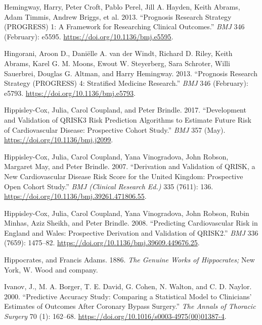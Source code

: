 \documentclass[
]{article}
\newlength{\cslhangindent}
\newenvironment{cslreferences}%
  {\setlength{\parindent}{0pt}%
  \everypar{\setlength{\hangindent}{\cslhangindent}}\ignorespaces}%
  {\par}
\begin{document}
\begin{cslreferences}
\leavevmode\hypertarget{ref-hemingway_prognosis_2013}{}%
Hemingway, Harry, Peter Croft, Pablo Perel, Jill A. Hayden, Keith Abrams, Adam Timmis, Andrew Briggs, et al. 2013. ``Prognosis Research Strategy (PROGRESS) 1: A Framework for Researching Clinical Outcomes.'' \emph{BMJ} 346 (February): e5595. \url{https://doi.org/10.1136/bmj.e5595}.

\leavevmode\hypertarget{ref-hingorani_prognosis_2013}{}%
Hingorani, Aroon D., Daniëlle A. van der Windt, Richard D. Riley, Keith Abrams, Karel G. M. Moons, Ewout W. Steyerberg, Sara Schroter, Willi Sauerbrei, Douglas G. Altman, and Harry Hemingway. 2013. ``Prognosis Research Strategy (PROGRESS) 4: Stratified Medicine Research.'' \emph{BMJ} 346 (February): e5793. \url{https://doi.org/10.1136/bmj.e5793}.

\leavevmode\hypertarget{ref-hippisley-cox_development_2017}{}%
Hippisley-Cox, Julia, Carol Coupland, and Peter Brindle. 2017. ``Development and Validation of QRISK3 Risk Prediction Algorithms to Estimate Future Risk of Cardiovascular Disease: Prospective Cohort Study.'' \emph{BMJ} 357 (May). \url{https://doi.org/10.1136/bmj.j2099}.

\leavevmode\hypertarget{ref-hippisley-cox_derivation_2007}{}%
Hippisley-Cox, Julia, Carol Coupland, Yana Vinogradova, John Robson, Margaret May, and Peter Brindle. 2007. ``Derivation and Validation of QRISK, a New Cardiovascular Disease Risk Score for the United Kingdom: Prospective Open Cohort Study.'' \emph{BMJ (Clinical Research Ed.)} 335 (7611): 136. \url{https://doi.org/10.1136/bmj.39261.471806.55}.

\leavevmode\hypertarget{ref-hippisley-cox_predicting_2008}{}%
Hippisley-Cox, Julia, Carol Coupland, Yana Vinogradova, John Robson, Rubin Minhas, Aziz Sheikh, and Peter Brindle. 2008. ``Predicting Cardiovascular Risk in England and Wales: Prospective Derivation and Validation of QRISK2.'' \emph{BMJ} 336 (7659): 1475--82. \url{https://doi.org/10.1136/bmj.39609.449676.25}.

\leavevmode\hypertarget{ref-hippocrates_genuine_1886}{}%
Hippocrates, and Francis Adams. 1886. \emph{The Genuine Works of Hippocrates;} New York, W. Wood and company.

\leavevmode\hypertarget{ref-ivanov_predictive_2000}{}%
Ivanov, J., M. A. Borger, T. E. David, G. Cohen, N. Walton, and C. D. Naylor. 2000. ``Predictive Accuracy Study: Comparing a Statistical Model to Clinicians' Estimates of Outcomes After Coronary Bypass Surgery.'' \emph{The Annals of Thoracic Surgery} 70 (1): 162--68. \url{https://doi.org/10.1016/s0003-4975(00)01387-4}.


\end{cslreferences}
\end{document}
